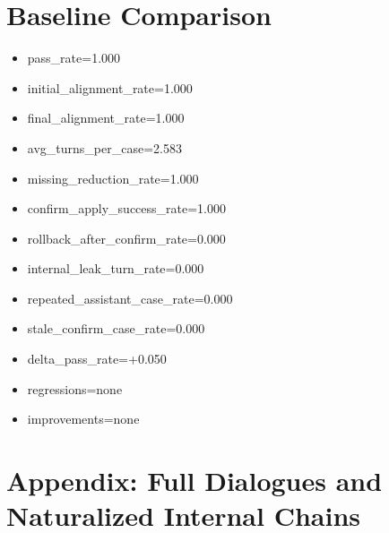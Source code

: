 \documentclass[11pt]{ctexart}
\begin{document}
\section{Baseline Comparison}
\begin{itemize}
\item pass\_rate=1.000
\item initial\_alignment\_rate=1.000
\item final\_alignment\_rate=1.000
\item avg\_turns\_per\_case=2.583
\item missing\_reduction\_rate=1.000
\item confirm\_apply\_success\_rate=1.000
\item rollback\_after\_confirm\_rate=0.000
\item internal\_leak\_turn\_rate=0.000
\item repeated\_assistant\_case\_rate=0.000
\item stale\_confirm\_case\_rate=0.000
\item delta\_pass\_rate=+0.050
\item regressions=none
\item improvements=none
\end{itemize}
\appendix
\section{Appendix: Full Dialogues and Naturalized Internal Chains}
\end{document}
